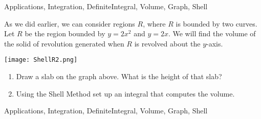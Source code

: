 \begin{tagblock}{Applications, Integration, DefiniteIntegral, Volume, Graph, Shell}
\begin{question}
	


As we did earlier, we can consider regions $R$, where $R$ is bounded by two curves.  Let $R$ be the region bounded by  $y=2x^2$ and $y=2x$.  We will find the volume of the  solid of revolution generated when $R$ is revolved about the $y$-axis. 

\begin{minipage}{.4\textwidth} \texttt{[image: ShellR2.png]} \end{minipage}%
 \begin{minipage}{.6\textwidth}
\begin{enumerate}
\item Draw a slab on the graph above.  What is the height of that slab?  

\vspace{.5in}
\item Using the Shell Method set up an integral that computes the volume. 
\end{enumerate}

\end{minipage}




    
\begin{tags}
       Applications, Integration, DefiniteIntegral, Volume, Graph, Shell
\end{tags}
    
\begin{diary}
        
\end{diary}
	
\begin{solution}

\end{solution}
	
\end{question}

\end{tagblock}

